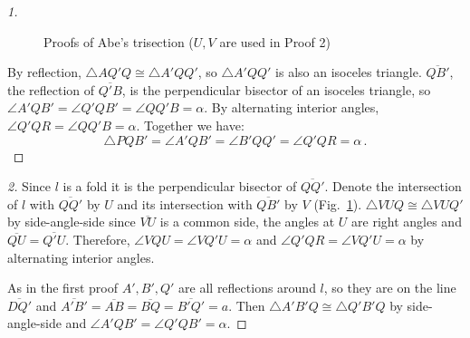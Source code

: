 \begin{proof}[1]
\begin{figure}[ht]
\begin{center}
\end{center}
\caption{Proofs of Abe's trisection ($U,V$ are used in Proof 2)}\label{f.abe2}
\end{figure}

By reflection, $\triangle AQ'Q\cong \triangle A'QQ'$, so $\triangle A'QQ'$ is also an isoceles triangle.
$\overline{QB'}$, the reflection of $\overline{Q'B}$, is the perpendicular bisector of an isoceles triangle, so $\angle A'QB'=\angle Q'QB'=\angle QQ'B=\alpha$.
By alternating interior angles, $\angle Q'QR=\angle QQ'B=\alpha$.
Together we have:
\[
\triangle PQB'=\angle A'QB'=\angle B'QQ'=\angle Q'QR=\alpha\,.
\]
\end{proof}

\begin{proof}[2]
Since $l$ is a fold it is the perpendicular bisector of $\overline{QQ'}$. Denote the intersection of $l$ with $\overline{QQ'}$ by $U$ and its intersection with $\overline{QB'}$ by $V$ (Fig.~\ref{f.abe2}). $\triangle VUQ\cong \triangle VUQ'$ by side-angle-side since $\overline{VU}$ is a common side,  the angles at $U$ are right angles and $\overline{QU}=\overline{Q'U}$. Therefore, $\angle VQU=\angle VQ'U=\alpha$ and $\angle Q'QR=\angle VQ'U=\alpha$ by alternating interior angles.

As in the first proof $A', B', Q'$ are all reflections around $l$, so they are on the line $\overline{DQ'}$ and $\overline{A'B'}=\overline{AB}=\overline{BQ}=\overline{B'Q'}=a$. Then $\triangle A'B'Q\cong\triangle Q'B'Q$ by side-angle-side and $\angle A'QB'=\angle Q'QB'=\alpha$.
\end{proof}


